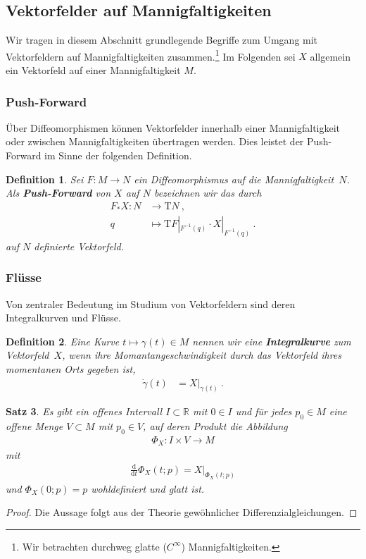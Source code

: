 \documentclass[10pt,a4paper]{article}
\theoremstyle{mytheorem}
\newtheorem{theorem}{Satz}[section]
\theoremstyle{mydefinition}
\newtheorem{definition}[theorem]{Definition}
\newcommand{\mydef}[1]{\textbf{\textit{#1}}}
\newcommand{\dt}{\mathrm{d}}
\newcommand{\Tt}{\mathrm{T}}
\begin{document}
\subsection{Vektorfelder auf Mannigfaltigkeiten}

Wir tragen in diesem Abschnitt grundlegende Begriffe zum Umgang mit Vektorfeldern auf Mannigfaltigkeiten zusammen.\footnote{
	Wir betrachten durchweg glatte ($C^\infty$) Mannigfaltigkeiten.
}
Im Folgenden sei $X$ allgemein ein Vektorfeld auf einer Mannigfaltigkeit $M$.

\subsubsection{Push-Forward}

Über Diffeomorphismen können Vektorfelder innerhalb einer Mannigfaltigkeit oder zwischen Mannigfaltigkeiten übertragen werden.
Dies leistet der Push-Forward im Sinne der folgenden Definition.
\begin{definition}
Sei $F:M\rightarrow N$ ein Diffeomorphismus auf die Mannigfaltigkeit~$N$.
Als \mydef{Push-Forward} von $X$ auf $N$ bezeichnen wir das durch
\begin{align*}
	F_*X: N &\rightarrow \Tt N
	\ ,\nonumber\\
	q &\mapsto \Tt F|_{F^{-1}(q)}\cdot X|_{F^{-1}(q)}
	\ .
\end{align*}
auf $N$ definierte Vektorfeld.
\end{definition}

\subsubsection{Flüsse}

Von zentraler Bedeutung im Studium von Vektorfeldern sind deren Integralkurven und Flüsse.
\begin{definition}
Eine Kurve $t\mapsto\gamma(t)\in M$ nennen wir eine \mydef{Integralkurve} zum Vektorfeld~$X$, wenn ihre Momantangeschwindigkeit durch das Vektorfeld ihres momentanen Orts gegeben ist,
\begin{align*}
	\dot{\gamma}(t) &= X|_{\gamma(t)}
	\ .
\end{align*}
\end{definition}

\begin{theorem}
Es gibt ein offenes Intervall $I\subset\mathbb{R}$ mit $0\in I$ und für jedes $p_0\in M$ eine offene Menge $V\subset M$ mit $p_0\in V$, auf deren Produkt die Abbildung
\begin{align*}
	\Phi_X: I\times V \rightarrow M
\end{align*}
mit
\begin{align*}
	\frac{\dt}{\dt t}\Phi_X(t; p) = X|_{\Phi_X(t; p)}
\end{align*}
und $\Phi_X(0; p)=p$ wohldefiniert und glatt ist.
\end{theorem}
\begin{proof}
Die Aussage folgt aus der Theorie gewöhnlicher Differenzialgleichungen.
\end{proof}
\end{document}
